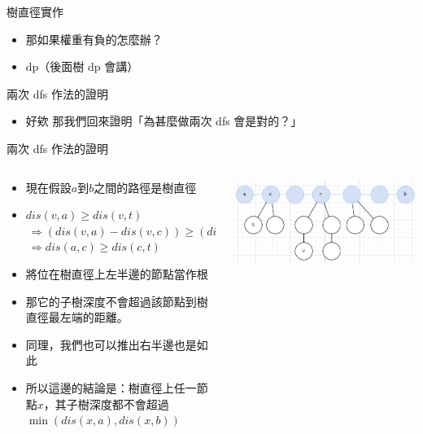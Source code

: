 \documentclass[aspectratio=169]{beamer}
\begin{document}
    \begin{frame}{樹直徑實作}
        \begin{itemize}
            \item 那如果權重有負的怎麼辦？
            \item<2-> dp（後面樹 dp 會講）
        \end{itemize}
    \end{frame}
    \begin{frame}{兩次 dfs 作法的證明}
        \begin{itemize}
            \item 好欸 那我們回來證明「為甚麼做兩次 dfs 會是對的？」
        \end{itemize}
    \end{frame}
    \begin{frame}{兩次 dfs 作法的證明}
    \begin{columns}
    \begin{column}{0.5\textwidth}
        \begin{itemize}
            \item 現在假設$a$到$b$之間的路徑是樹直徑
            \item $dis(v,a)\geq dis(v,t)$ \\
            $\, \Longrightarrow (dis(v,a)-dis(v,c))\geq (dis(v,t)-dis(v,c))$\\
            $\, \Longrightarrow dis(a,c)\geq dis(c,t)$ 
            \item<2-> 將位在樹直徑上左半邊的節點當作根
            \item<2-> 那它的子樹深度不會超過該節點到樹直徑最左端的距離。
            \item<3-> 同理，我們也可以推出右半邊也是如此
            \item<4-> 所以這邊的結論是：樹直徑上任一節點$x$，其子樹深度都不會超過$\min(dis(x,a),dis(x,b))$
        \end{itemize}
    \end{column}
    \begin{column}{0.5\textwidth}
        \includegraphics[width=\textwidth]{images/dfs_proof.png}
    \end{column}
    \end{columns}
    \end{frame}
\end{document}
